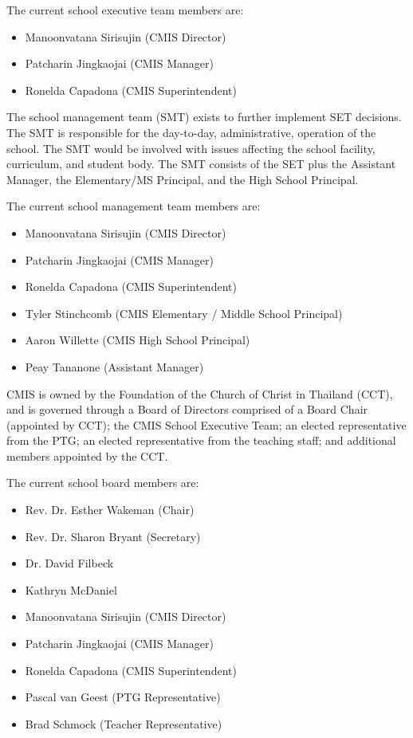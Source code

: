 The current school executive team members are:

\begin{itemize}
\item Manoonvatana Sirisujin (CMIS Director) 
\item Patcharin Jingkaojai (CMIS Manager) 
\item Ronelda Capadona (CMIS Superintendent) 
\end{itemize}


The school management team (SMT) exists to further implement SET decisions.  The SMT is responsible for the day-to-day, administrative, operation of the school.  The SMT would be involved with issues affecting the school facility, curriculum, and student body. The SMT consists of the SET plus the Assistant Manager, the Elementary/MS Principal, and the High School Principal. 

The current school management team members are:

\begin{itemize}
\item Manoonvatana Sirisujin (CMIS Director) 
\item Patcharin Jingkaojai (CMIS Manager) 
\item Ronelda Capadona (CMIS Superintendent)
\item Tyler Stinchcomb (CMIS Elementary / Middle School Principal)
\item Aaron Willette (CMIS High School Principal)
\item Peay Tananone (Assistant Manager)
\end{itemize}


CMIS is owned by the Foundation of the Church of Christ in Thailand (CCT), and is governed through a Board of Directors comprised of a Board Chair (appointed by CCT); the CMIS School Executive Team; an elected representative from the PTG; an elected representative from the teaching staff; and additional members appointed by the CCT.

The current school board members are: 

\begin{itemize}
\item Rev. Dr. Esther Wakeman (Chair)
\item Rev. Dr. Sharon Bryant (Secretary)
\item Dr. David Filbeck
\item Kathryn McDaniel
\item Manoonvatana Sirisujin (CMIS Director) 
\item Patcharin Jingkaojai (CMIS Manager) 
\item Ronelda Capadona (CMIS Superintendent) 
\item Pascal van Geest (PTG Representative)
\item Brad Schmock (Teacher Representative)
\end{itemize}


